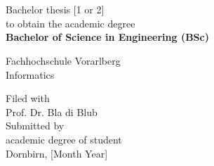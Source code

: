 \newpage
{} %
\begin{titlepage}
  \mbox{}
  \vspace{5mm}
  \begin{center}
    \huge{\textbf{}} \\
    \huge{\textbf{}}\\
  \end{center}
  \vspace{40mm}
  \begin{flushright}
  Bachelor thesis [1 or 2]\\
  to obtain the academic degree\\
  \textbf{Bachelor of Science in Engineering (BSc)}

  \vspace{20mm}
  Fachhochschule Vorarlberg\\
  Informatics

  \vspace{40mm}
  Filed with\\\relax
  Prof. Dr. Bla di Blub\\
  Submitted by\\\relax
  academic degree of student\\

  \vspace{20mm}
  Dornbirn, [Month Year]
  \end{flushright}
\end{titlepage}
